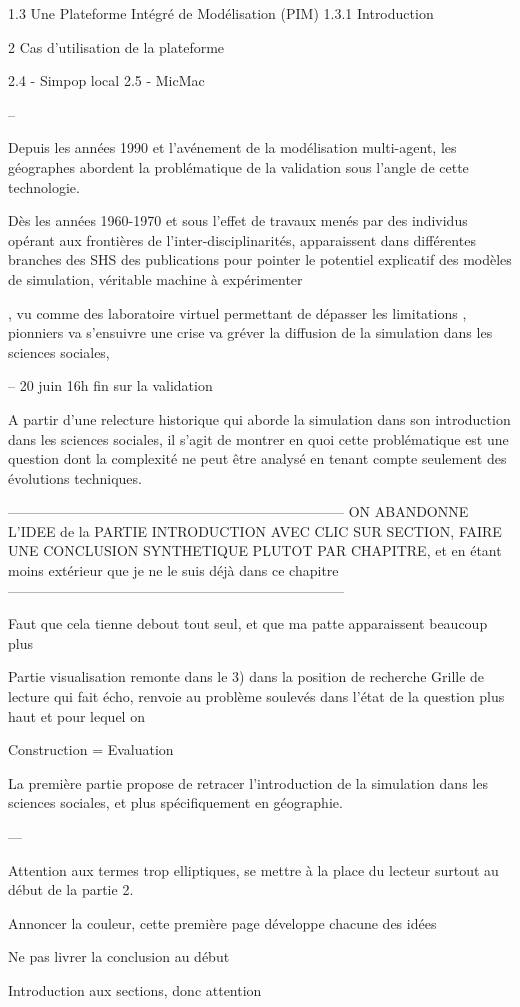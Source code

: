 1.3 Une Plateforme Intégré de Modélisation (PIM)
	1.3.1 Introduction

2 Cas d'utilisation de la plateforme

2.4 - Simpop local
2.5 - MicMac 

--

Depuis les années 1990 et l'avénement de la modélisation multi-agent, les géographes abordent la problématique de la validation sous l'angle de cette technologie.

Dès les années 1960-1970 et sous l'effet de travaux menés par des individus opérant aux frontières de l'inter-disciplinarités, apparaissent dans différentes branches des SHS des publications pour pointer le potentiel explicatif des modèles de simulation, véritable machine à expérimenter 

,  vu comme des laboratoire virtuel permettant de dépasser les limitations  ,  pionniers va s'ensuivre une crise va gréver la diffusion de la simulation dans les sciences sociales, 

--
20 juin 16h fin sur la validation 


A partir d'une relecture historique qui aborde la simulation dans son introduction dans les sciences sociales, il s'agit de montrer en quoi cette problématique est une question dont la complexité ne peut être analysé en tenant compte seulement des évolutions techniques.	

------------------------------------------------------------------------
ON ABANDONNE L'IDEE de la PARTIE INTRODUCTION AVEC CLIC SUR SECTION, FAIRE UNE CONCLUSION SYNTHETIQUE PLUTOT PAR CHAPITRE, et en étant moins extérieur que je ne le suis déjà dans ce chapitre
------------------------------------------------------------------------



Faut que cela tienne debout tout seul, et que ma patte apparaissent beaucoup plus 

Partie visualisation remonte dans le 3) dans la position de recherche
Grille de lecture qui fait écho, renvoie au problème soulevés dans l'état de la question plus haut et pour lequel on 






Construction = Evaluation

La première partie propose de retracer l'introduction de la simulation dans les sciences sociales, et plus spécifiquement en géographie. 




---

Attention aux termes trop elliptiques, se mettre à la place du lecteur surtout au début de la partie 2.

Annoncer la couleur, cette première page développe chacune des idées 


Ne pas livrer la conclusion au début 

Introduction aux sections, donc attention 



\printbibliography[heading=subbibliography]

\stopcontents[chapters]
